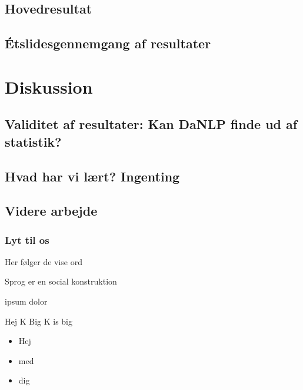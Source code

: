\documentclass{beamer}
\begin{document}
\subsection{Hovedresultat}
\subsection{Étslidesgennemgang af resultater}

\section{Diskussion}
\subsection{Validitet af resultater: Kan DaNLP finde ud af statistik?}
\subsection{Hvad har vi lært? Ingenting}
\subsection{Videre arbejde}

\begin{frame}
    \frametitle{Lyt til os}
    Her følger de vise ord
    \begin{definition}
        Sprog er en social konstruktion
    \end{definition}
    \begin{example}
        ipsum dolor
    \end{example}
    \begin{block}{Hej K}
        Big K is big
    \end{block}
    \begin{itemize}
        \pause
        \item Hej
        \pause
        \item med
        \pause
        \item dig
    \end{itemize}
\end{frame}
\end{document}

